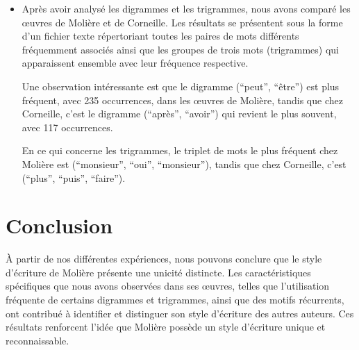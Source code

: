 \documentclass[]{report}
\begin{document}
\begin{itemize}
	\item Après avoir analysé les digrammes et les trigrammes, nous avons comparé les œuvres de Molière et de Corneille. Les résultats se présentent sous la forme d'un fichier texte répertoriant toutes les paires de mots différents fréquemment associés ainsi que les groupes de trois mots (trigrammes) qui apparaissent ensemble avec leur fréquence respective.
	
	Une observation intéressante est que le digramme (``peut'', ``être'') est plus fréquent, avec 235 occurrences, dans les œuvres de Molière, tandis que chez Corneille, c'est le digramme (``après'', ``avoir'') qui revient le plus souvent, avec 117 occurrences.
	
	En ce qui concerne les trigrammes, le triplet de mots le plus fréquent chez Molière est (``monsieur'', ``oui'', ``monsieur''), tandis que chez Corneille, c'est (``plus'', ``puis'', ``faire'').
	
\end{itemize}
\section{Conclusion}
\vspace{\baselineskip}
\hspace{0,5cm} À partir de nos différentes expériences, nous pouvons conclure que le style d'écriture de Molière présente une unicité distincte. Les caractéristiques spécifiques que nous avons observées dans ses œuvres, telles que l'utilisation fréquente de certains digrammes et trigrammes, ainsi que des motifs récurrents, ont contribué à identifier et distinguer son style d'écriture des autres auteurs. Ces résultats renforcent l'idée que Molière possède un style d'écriture unique et reconnaissable.
\end{document}

